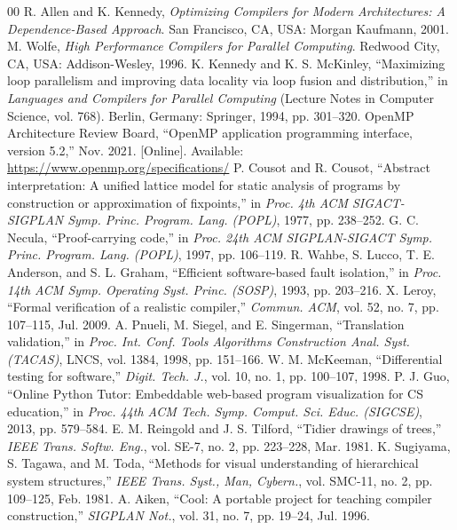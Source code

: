 \documentclass[conference]{IEEEtran}
\begin{document}
\begin{thebibliography}{00}
 R. Allen and K. Kennedy, \emph{Optimizing Compilers for Modern Architectures: A Dependence-Based Approach}. San Francisco, CA, USA: Morgan Kaufmann, 2001.
 M. Wolfe, \emph{High Performance Compilers for Parallel Computing}. Redwood City, CA, USA: Addison-Wesley, 1996.
 K. Kennedy and K. S. McKinley, ``Maximizing loop parallelism and improving data locality via loop fusion and distribution,'' in \emph{Languages and Compilers for Parallel Computing} (Lecture Notes in Computer Science, vol. 768). Berlin, Germany: Springer, 1994, pp. 301--320.
 OpenMP Architecture Review Board, ``OpenMP application programming interface, version 5.2,'' Nov. 2021. [Online]. Available: \url{https://www.openmp.org/specifications/}
 P. Cousot and R. Cousot, ``Abstract interpretation: A unified lattice model for static analysis of programs by construction or approximation of fixpoints,'' in \emph{Proc. 4th ACM SIGACT-SIGPLAN Symp. Princ. Program. Lang. (POPL)}, 1977, pp. 238--252.
 G. C. Necula, ``Proof-carrying code,'' in \emph{Proc. 24th ACM SIGPLAN-SIGACT Symp. Princ. Program. Lang. (POPL)}, 1997, pp. 106--119.
 R. Wahbe, S. Lucco, T. E. Anderson, and S. L. Graham, ``Efficient software-based fault isolation,'' in \emph{Proc. 14th ACM Symp. Operating Syst. Princ. (SOSP)}, 1993, pp. 203--216.
 X. Leroy, ``Formal verification of a realistic compiler,'' \emph{Commun. ACM}, vol. 52, no. 7, pp. 107--115, Jul. 2009.
 A. Pnueli, M. Siegel, and E. Singerman, ``Translation validation,'' in \emph{Proc. Int. Conf. Tools Algorithms Construction Anal. Syst. (TACAS)}, LNCS, vol. 1384, 1998, pp. 151--166.
 W. M. McKeeman, ``Differential testing for software,'' \emph{Digit. Tech. J.}, vol. 10, no. 1, pp. 100--107, 1998.
 P. J. Guo, ``Online Python Tutor: Embeddable web-based program visualization for CS education,'' in \emph{Proc. 44th ACM Tech. Symp. Comput. Sci. Educ. (SIGCSE)}, 2013, pp. 579--584.
 E. M. Reingold and J. S. Tilford, ``Tidier drawings of trees,'' \emph{IEEE Trans. Softw. Eng.}, vol. SE-7, no. 2, pp. 223--228, Mar. 1981.
 K. Sugiyama, S. Tagawa, and M. Toda, ``Methods for visual understanding of hierarchical system structures,'' \emph{IEEE Trans. Syst., Man, Cybern.}, vol. SMC-11, no. 2, pp. 109--125, Feb. 1981.
 A. Aiken, ``Cool: A portable project for teaching compiler construction,'' \emph{SIGPLAN Not.}, vol. 31, no. 7, pp. 19--24, Jul. 1996.

\end{thebibliography}
\end{document}
